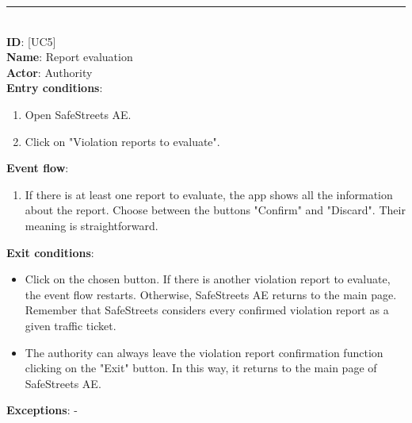 \documentclass{article}
\newcommand\usecase[1]{ [UC#1] }
\begin{document}
				\rule{\linewidth}{0.4pt}
				\\
				
				\textbf{ID}: \usecase{5} \\
				\textbf{Name}: Report evaluation\\
				\textbf{Actor}: Authority\\
				\textbf{Entry conditions}:
				\begin{enumerate}
					\item Open SafeStreets AE.
					\item Click on "Violation reports to evaluate".
				\end{enumerate}
				\textbf{Event flow}:
				\begin{enumerate}
					\item If there is at least one report to evaluate, the app shows all the information about the report. Choose between the buttons "Confirm" and "Discard". Their meaning is straightforward.
				\end{enumerate}
				\textbf{Exit conditions}:
				\begin{itemize}
					\item Click on the chosen button. If there is another violation report to evaluate, the event flow restarts. Otherwise, SafeStreets AE returns to the main page. Remember that SafeStreets considers every confirmed violation report as a given traffic ticket.
					\item The authority can always leave the violation report confirmation function clicking on the "Exit" button. In this way, it returns to the main page of SafeStreets AE.
				\end{itemize}
				\textbf{Exceptions}: -\\
				
			\clearpage
\end{document}
